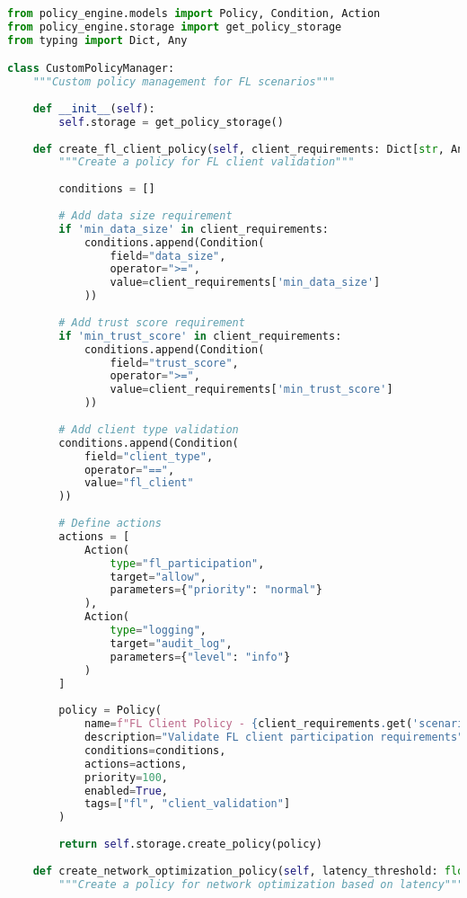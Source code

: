 \begin{lstlisting}[language=python, caption=Custom Policy Definition]
from policy_engine.models import Policy, Condition, Action
from policy_engine.storage import get_policy_storage
from typing import Dict, Any

class CustomPolicyManager:
    """Custom policy management for FL scenarios"""
    
    def __init__(self):
        self.storage = get_policy_storage()
    
    def create_fl_client_policy(self, client_requirements: Dict[str, Any]) -> Policy:
        """Create a policy for FL client validation"""
        
        conditions = []
        
        # Add data size requirement
        if 'min_data_size' in client_requirements:
            conditions.append(Condition(
                field="data_size",
                operator=">=",
                value=client_requirements['min_data_size']
            ))
        
        # Add trust score requirement
        if 'min_trust_score' in client_requirements:
            conditions.append(Condition(
                field="trust_score",
                operator=">=",
                value=client_requirements['min_trust_score']
            ))
        
        # Add client type validation
        conditions.append(Condition(
            field="client_type",
            operator="==",
            value="fl_client"
        ))
        
        # Define actions
        actions = [
            Action(
                type="fl_participation",
                target="allow",
                parameters={"priority": "normal"}
            ),
            Action(
                type="logging",
                target="audit_log",
                parameters={"level": "info"}
            )
        ]
        
        policy = Policy(
            name=f"FL Client Policy - {client_requirements.get('scenario', 'default')}",
            description="Validate FL client participation requirements",
            conditions=conditions,
            actions=actions,
            priority=100,
            enabled=True,
            tags=["fl", "client_validation"]
        )
        
        return self.storage.create_policy(policy)
    
    def create_network_optimization_policy(self, latency_threshold: float) -> Policy:
        """Create a policy for network optimization based on latency"""
        

\end{lstlisting}
